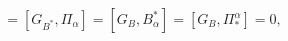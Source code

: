 \begin{equation}
[G_{B^{\ast}},B^{\alpha}]=[G_{B^{\ast}},\Pi_{\alpha}]=[G_{B},B_{\alpha
}^{\ast}]=[G_{B},\Pi_{\ast}^{\alpha}]=0, \label{3.15}%
\end{equation}

